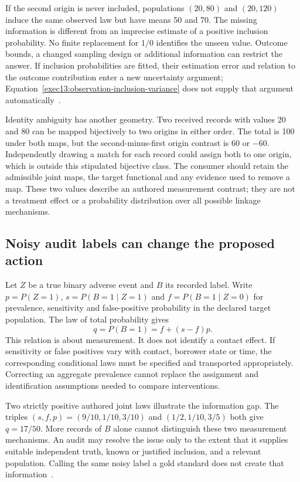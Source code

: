 If the second origin is never included, populations $(20,80)$ and
$(20,120)$ induce the same observed law but have means 50 and 70. The
missing information is different from an imprecise estimate of a positive
inclusion probability. No finite replacement for $1/0$ identifies the unseen
value. Outcome bounds, a changed sampling design or additional information
can restrict the answer. If inclusion probabilities are fitted, their
estimation error and relation to the outcome contribution enter a new
uncertainty argument; Equation~\eqref{exec13:observation-inclusion-variance}
does not supply that argument automatically~\citep{exec13_observation_exact}.

Identity ambiguity has another geometry. Two received records with values
20 and 80 can be mapped bijectively to two origins in either order. The
total is 100 under both maps, but the second-minus-first origin contrast is
60 or $-60$. Independently drawing a match for each record could assign
both to one origin, which is outside this stipulated bijective class.
The consumer should retain the admissible joint maps, the target functional
and any evidence used to remove a map. These two values describe an authored
measurement contrast; they are not a treatment effect or a probability
distribution over all possible linkage mechanisms.

\subsection{Noisy audit labels can change the proposed action}

Let $Z$ be a true binary adverse event and $B$ its recorded label. Write
$p=P(Z=1)$, $s=P(B=1\mid Z=1)$ and $f=P(B=1\mid Z=0)$ for prevalence,
sensitivity and false-positive probability in the declared target population.
The law of total probability gives
\begin{equation}
 q=P(B=1)=f+(s-f)p.
 \label{exec13:observation-label-law}
\end{equation}
This relation is about measurement. It does not identify a contact effect.
If sensitivity or false positives vary with contact, borrower state or time,
the corresponding conditional laws must be specified and transported
appropriately. Correcting an aggregate prevalence cannot replace the
assignment and identification assumptions needed to compare interventions.

Two strictly positive authored joint laws illustrate the information gap.
The triples $(s,f,p)=(9/10,1/10,3/10)$ and $(1/2,1/10,3/5)$ both give
$q=17/50$. More records of $B$ alone cannot distinguish these two
measurement mechanisms. An audit may resolve the issue only to the extent
that it supplies suitable independent truth, known or justified inclusion,
and a relevant population. Calling the same noisy label a gold standard
does not create that information~\citep{exec13_observation_exact}.

